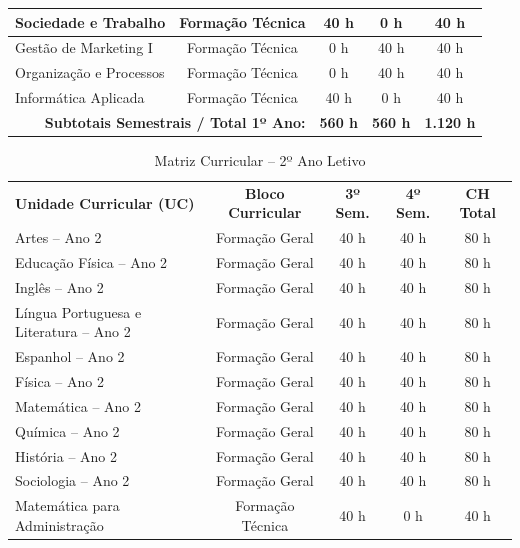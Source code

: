 \begin{table}[H]
\begin{tabularx}{\linewidth}{|X|c|c|c|c|}
Sociedade e Trabalho & Formação Técnica & 40 h & 0 h & 40 h \\ \hline
Gestão de Marketing I & Formação Técnica & 0 h & 40 h & 40 h \\ \hline
Organização e Processos & Formação Técnica & 0 h & 40 h & 40 h \\ \hline
Informática Aplicada & Formação Técnica & 40 h & 0 h & 40 h \\ \hline
\multicolumn{2}{|r|}{\textbf{Subtotais Semestrais / Total 1º Ano:}} & \textbf{560 h} & \textbf{560 h} & \textbf{1.120 h} \\ \hline
\end{tabularx}
\end{table}

\begin{table}[H]
\centering
\small
\caption{Matriz Curricular -- 2º Ano Letivo}
\label{qua:matriz-ano2}
\vspace{0.2cm}
\begin{tabularx}{\linewidth}{|X|c|c|c|c|}
\hline
\rowcolor{ifscgreen!20}
\multicolumn{5}{|c|}{\textbf{\large 2º ANO LETIVO (SEMESTRES 3 E 4)}} \\ \hline
\rowcolor{cinzaTabela}
\textbf{Unidade Curricular (UC)} & \textbf{Bloco Curricular} & \textbf{3º Sem.} & \textbf{4º Sem.} & \textbf{CH Total} \\ \hline
Artes -- Ano 2 & Formação Geral & 40 h & 40 h & 80 h \\ \hline
Educação Física -- Ano 2 & Formação Geral & 40 h & 40 h & 80 h \\ \hline
Inglês -- Ano 2 & Formação Geral & 40 h & 40 h & 80 h \\ \hline
Língua Portuguesa e Literatura -- Ano 2 & Formação Geral & 40 h & 40 h & 80 h \\ \hline
Espanhol -- Ano 2 & Formação Geral & 40 h & 40 h & 80 h \\ \hline
Física -- Ano 2 & Formação Geral & 40 h & 40 h & 80 h \\ \hline
Matemática -- Ano 2 & Formação Geral & 40 h & 40 h & 80 h \\ \hline
Química -- Ano 2 & Formação Geral & 40 h & 40 h & 80 h \\ \hline
História -- Ano 2 & Formação Geral & 40 h & 40 h & 80 h \\ \hline
Sociologia -- Ano 2 & Formação Geral & 40 h & 40 h & 80 h \\ \hline
Matemática para Administração & Formação Técnica & 40 h & 0 h & 40 h \\ \hline

\end{tabularx}
\end{table}
